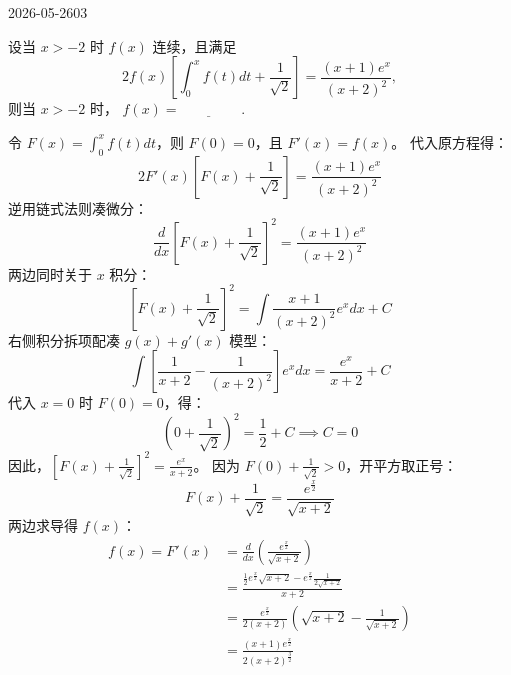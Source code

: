 \begin{mistake}{2026-05-26}{03}

\begin{problemcontent}
设当 \(x > -2\) 时 \(f(x)\) 连续，且满足
\[ 2f(x) \left[ \int_0^x f(t) dt + \frac{1}{\sqrt{2}} \right] = \frac{(x+1)e^x}{(x+2)^2}, \]
则当 \(x > -2\) 时， \(f(x) = \underline{\quad\quad\quad\quad}\) .
\end{problemcontent}

\begin{solutioncontent}
令 \(F(x) = \int_0^x f(t) dt\)，则 \(F(0) = 0\)，且 \(F'(x) = f(x)\)。
代入原方程得：
\[ 2 F'(x) \left[ F(x) + \frac{1}{\sqrt{2}} \right] = \frac{(x+1)e^x}{(x+2)^2} \]
逆用链式法则凑微分：
\[ \frac{d}{dx} \left[ F(x) + \frac{1}{\sqrt{2}} \right]^2 = \frac{(x+1)e^x}{(x+2)^2} \]
两边同时关于 \(x\) 积分：
\[ \left[ F(x) + \frac{1}{\sqrt{2}} \right]^2 = \int \frac{x+1}{(x+2)^2} e^x dx + C \]
右侧积分拆项配凑 \(g(x) + g'(x)\) 模型：
\[ \int \left[ \frac{1}{x+2} - \frac{1}{(x+2)^2} \right] e^x dx = \frac{e^x}{x+2} + C \]
代入 \(x=0\) 时 \(F(0)=0\)，得：
\[ \left( 0 + \frac{1}{\sqrt{2}} \right)^2 = \frac{1}{2} + C \implies C = 0 \]
因此，\(\left[ F(x) + \frac{1}{\sqrt{2}} \right]^2 = \frac{e^x}{x+2}\)。
因为 \(F(0) + \frac{1}{\sqrt{2}} > 0\)，开平方取正号：
\[ F(x) + \frac{1}{\sqrt{2}} = \frac{e^{\frac{x}{2}}}{\sqrt{x+2}} \]
两边求导得 \(f(x)\)：
\[ \begin{aligned} f(x) = F'(x) &= \frac{d}{dx} \left( \frac{e^{\frac{x}{2}}}{\sqrt{x+2}} \right) \\ &= \frac{\frac{1}{2}e^{\frac{x}{2}}\sqrt{x+2} - e^{\frac{x}{2}}\frac{1}{2\sqrt{x+2}}}{x+2} \\ &= \frac{e^{\frac{x}{2}}}{2(x+2)} \left( \sqrt{x+2} - \frac{1}{\sqrt{x+2}} \right) \\ &= \frac{(x+1)e^{\frac{x}{2}}}{2(x+2)^{\frac{3}{2}}} \end{aligned} \]
\end{solutioncontent}


\end{mistake}
